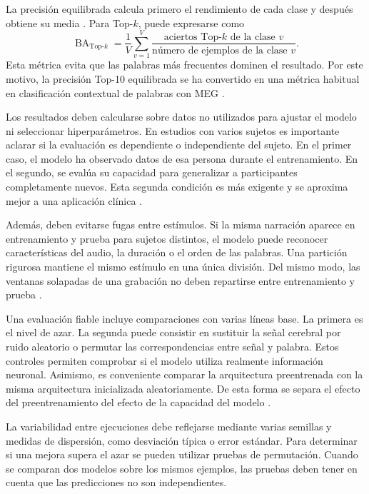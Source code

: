 La precisión equilibrada calcula primero el rendimiento de cada clase y después obtiene su media \cite{brodersen2010balanced}. Para Top-\(k\), puede expresarse como
\[
    \operatorname{BA}_{\text{Top-}k} =
    \frac{1}{V}
    \sum_{v=1}^{V}
    \frac{\text{aciertos Top-}k\text{ de la clase }v}
    {\text{número de ejemplos de la clase }v}.
\]
Esta métrica evita que las palabras más frecuentes dominen el resultado. Por este motivo, la precisión Top-10 equilibrada se ha convertido en una métrica habitual en clasificación contextual de palabras con MEG \cite{ozdogan2025libribrain,jayalath2026megxl}.

Los resultados deben calcularse sobre datos no utilizados para ajustar el modelo ni seleccionar hiperparámetros. En estudios con varios sujetos es importante aclarar si la evaluación es dependiente o independiente del sujeto. En el primer caso, el modelo ha observado datos de esa persona durante el entrenamiento. En el segundo, se evalúa su capacidad para generalizar a participantes completamente nuevos. Esta segunda condición es más exigente y se aproxima mejor a una aplicación clínica \cite{harris2021nonsense,jayalath2026megxl}.

Además, deben evitarse fugas entre estímulos. Si la misma narración aparece en entrenamiento y prueba para sujetos distintos, el modelo puede reconocer características del audio, la duración o el orden de las palabras. Una partición rigurosa mantiene el mismo estímulo en una única división. Del mismo modo, las ventanas solapadas de una grabación no deben repartirse entre entrenamiento y prueba \cite{harris2021nonsense,jayalath2026megxl}.

Una evaluación fiable incluye comparaciones con varias líneas base. La primera es el nivel de azar. La segunda puede consistir en sustituir la señal cerebral por ruido aleatorio o permutar las correspondencias entre señal y palabra. Estos controles permiten comprobar si el modelo utiliza realmente información neuronal. Asimismo, es conveniente comparar la arquitectura preentrenada con la misma arquitectura inicializada aleatoriamente. De esta forma se separa el efecto del preentrenamiento del efecto de la capacidad del modelo \cite{harris2021nonsense,jayalath2026megxl}.

La variabilidad entre ejecuciones debe reflejarse mediante varias semillas y medidas de dispersión, como desviación típica o error estándar. Para determinar si una mejora supera el azar se pueden utilizar pruebas de permutación. Cuando se comparan dos modelos sobre los mismos ejemplos, las pruebas deben tener en cuenta que las predicciones no son independientes.

